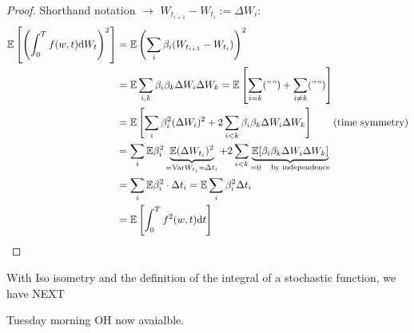 \begin{proof}
Shorthand notation $\to$ $W_{t_{i+1}} - W_{t_i} := \Delta W_{i}$:
\begin{align*}
\mathbb{E} \left[  \left( \int_0^T f(w, t) \text{d} W_t \right)^2 \right] 
	&= \mathbb{E} \left( \sum_i \beta_i ( W_{t_{i+1}} - W_{t_i} ) \right)^2 \\
	&= \mathbb{E} \sum_{i,k} \beta_i \beta_k \Delta W_i \Delta W_k 
		= \mathbb{E} \left[ \sum_{i=k} ("") + \sum_{i\neq k} ("" ) \right] \\
	&= \mathbb{E} \left[ \sum_i \beta_i^2 (\Delta W_i )^2 
		+ 2 \sum_{i< k} \beta_i \beta_k \Delta W_i \Delta W_k \right]
		\tag{time symmetry} \\  
	&= \sum_i \mathbb{E}\beta_i^2  
		\underbrace{ \mathbb{E} (\Delta W_{t_i})^2 }_{=\text{Var} W_{t_i} = \Delta t_i}
		+ 2 \sum_{i < k} 
			\underbrace{  
				\mathbb{E} [\beta_i \beta_k \Delta W_i \Delta W_k]
			 }_{=0\quad\text{by independence} } \\ 
	&= \sum_i \mathbb{E} \beta_i^2 \cdot \Delta t_i 
	  = \mathbb{E} \sum_i \beta_i^2\Delta t_i \\
	&= \mathbb{E} \left[ \int_0^T  f^2(w, t) \text{d} t \right]
\end{align*}
\end{proof}

With Iso isometry and the definition of the integral of a stochastic function, we have NEXT

Tuesday morning OH now avaialble. 

